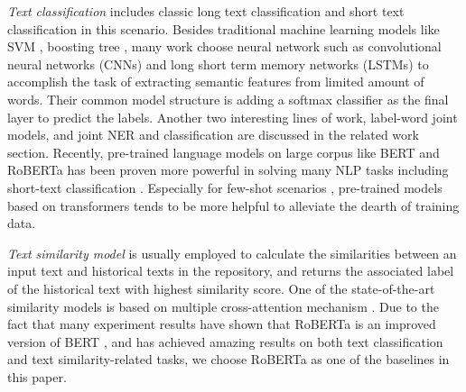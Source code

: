 \emph{Text classification}  includes  classic  long  text
classification  and  short  text  classification  in  this  scenario.  Besides
traditional  machine  learning  models  like  SVM \cite{suykens1999least},  
boosting  tree \cite{tu2005probabilistic},  many work
\cite{wen2016network}  choose  neural  network  such  as  convolutional neural
networks (CNNs) \cite{kim2014convolutional,zhang2015character,conneau2016very}
and       long       short       term       memory       networks      (LSTMs)
\cite{mousa2017contextual,liu2016recurrent}   to   accomplish   the   task  of
extracting  semantic  features from limited amount of words. Their common model
structure  is  adding  a  softmax classifier as the final layer to predict the
labels.  Another  two  interesting lines of work, label-word joint models, and
joint  NER  and  classification  are  discussed  in  the related work section.
Recently,   pre-trained   language   models   on   large  corpus  like  BERT
\cite{devlin2018bert}  and  RoBERTa \cite{liu2019roberta} has been proven more
powerful  in  solving  many  NLP  tasks  including  short-text  classification
\cite{madabushi2020cost}.      Especially      for      few-shot     scenarios
\cite{yu2018diverse},     pre-trained     models    based    on    transformers
\cite{vaswani2017attention} tends to be more helpful to alleviate the dearth of training data.

\emph{Text similarity model}  is usually employed to calculate the similarities between an input text 
and historical texts in the repository, and returns the associated label of the historical
text with highest similarity score. 
One of the state-of-the-art similarity models is based on multiple cross-attention
mechanism  \cite{barkan2020scalable}.
Due to the   fact   that   many   experiment   results   have   shown   that  RoBERTa
\cite{liu2019roberta} is an improved version of BERT \cite{devlin2018bert}, and has achieved amazing
results  on  both  text  classification and text similarity-related
tasks, we choose RoBERTa as one of the baselines in this paper.


